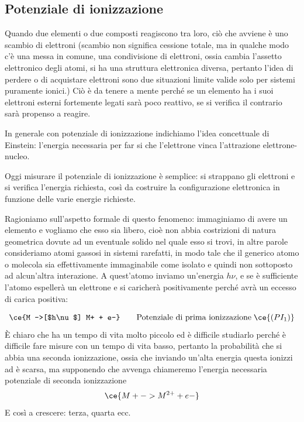 \subsection{Potenziale di ionizzazione}
Quando due elementi o due composti reagiscono tra loro, ciò che avviene è uno scambio di elettroni (scambio non significa cessione totale, ma in qualche modo c'è una messa in comune, una condivisione di elettroni, ossia cambia l'assetto elettronico degli atomi, si ha una struttura elettronica diversa, pertanto l'idea di perdere o di acquistare elettroni sono due situazioni limite valide solo per sistemi puramente ionici.) Ciò è da tenere a mente perché se un elemento ha i suoi elettroni esterni fortemente legati sarà poco reattivo, se si verifica il contrario sarà propenso a reagire.

\vspace{0.2cm}In generale con potenziale di ionizzazione indichiamo l'idea concettuale di Einstein: l'energia necessaria per far si che l'elettrone vinca l'attrazione elettrone-nucleo.

\vspace{0.2cm}Oggi misurare il potenziale di ionizzazione è semplice: si strappano gli elettroni e si verifica l'energia richiesta, così da costruire la configurazione elettronica in funzione delle varie energie richieste.

Ragioniamo sull'aspetto formale di questo fenomeno: immaginiamo di avere un elemento e vogliamo che esso sia libero, cioè non abbia costrizioni di natura geometrica dovute ad un eventuale solido nel quale esso si trovi, in altre parole consideriamo atomi gassosi in sistemi rarefatti, in modo tale che il generico atomo o molecola sia effettivamente immaginabile come isolato e quindi non sottoposto ad alcun'altra interazione. A quest'atomo inviamo un'energia $h\nu$, e se è sufficiente l'atomo espellerà un elettrone e si caricherà positivamente perché avrà un eccesso di carica positiva:

$$\ce{M ->[$h\nu$] M+ + e-} \qquad \text{Potenziale di prima ionizzazione} \; \ce{(PI_1)}$$
È chiaro che  ha un tempo di vita molto piccolo ed è difficile studiarlo perché è difficile fare misure con un tempo di vita basso, pertanto la probabilità che si abbia una seconda ionizzazione, ossia che inviando un'alta energia questa ionizzi  ad  è scarsa, ma supponendo che avvenga chiameremo l'energia necessaria potenziale di seconda ionizzazione 
$$\ce{M+ -> M^{2+} + e-}$$
E così a crescere: terza, quarta ecc.

